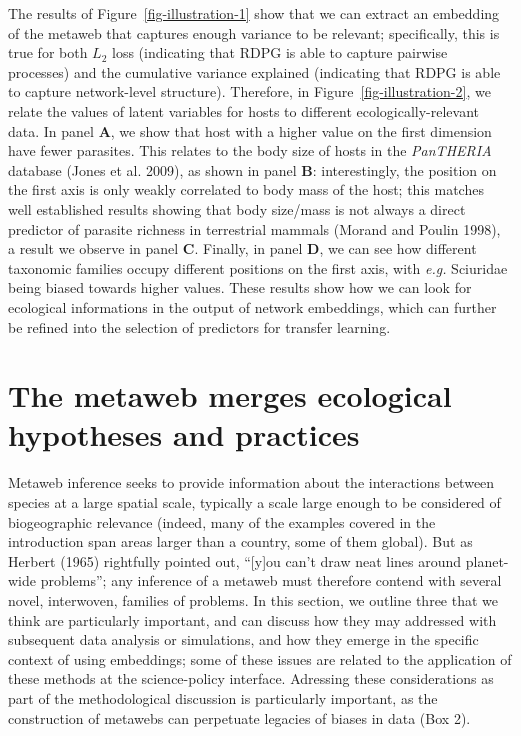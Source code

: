 \documentclass[
  letterpaper,
  DIV=11,
  numbers=noendperiod]{scrartcl}
\begin{document}
The results of Figure~\ref{fig-illustration-1} show that we can extract
an embedding of the metaweb that captures enough variance to be
relevant; specifically, this is true for both \(L_2\) loss (indicating
that RDPG is able to capture pairwise processes) and the cumulative
variance explained (indicating that RDPG is able to capture
network-level structure). Therefore, in Figure~\ref{fig-illustration-2},
we relate the values of latent variables for hosts to different
ecologically-relevant data. In panel \textbf{A}, we show that host with
a higher value on the first dimension have fewer parasites. This relates
to the body size of hosts in the \emph{PanTHERIA} database (Jones et al.
2009), as shown in panel \textbf{B}: interestingly, the position on the
first axis is only weakly correlated to body mass of the host; this
matches well established results showing that body size/mass is not
always a direct predictor of parasite richness in terrestrial mammals
(Morand and Poulin 1998), a result we observe in panel \textbf{C}.
Finally, in panel \textbf{D}, we can see how different taxonomic
families occupy different positions on the first axis, with \emph{e.g.}
Sciuridae being biased towards higher values. These results show how we
can look for ecological informations in the output of network
embeddings, which can further be refined into the selection of
predictors for transfer learning.

\hypertarget{the-metaweb-merges-ecological-hypotheses-and-practices}{%
\section{The metaweb merges ecological hypotheses and
practices}\label{the-metaweb-merges-ecological-hypotheses-and-practices}}

Metaweb inference seeks to provide information about the interactions
between species at a large spatial scale, typically a scale large enough
to be considered of biogeographic relevance (indeed, many of the
examples covered in the introduction span areas larger than a country,
some of them global). But as Herbert (1965) rightfully pointed out,
``{[}y{]}ou can't draw neat lines around planet-wide problems''; any
inference of a metaweb must therefore contend with several novel,
interwoven, families of problems. In this section, we outline three that
we think are particularly important, and can discuss how they may
addressed with subsequent data analysis or simulations, and how they
emerge in the specific context of using embeddings; some of these issues
are related to the application of these methods at the science-policy
interface. Adressing these considerations as part of the methodological
discussion is particularly important, as the construction of metawebs
can perpetuate legacies of biases in data (Box 2).
\end{document}
